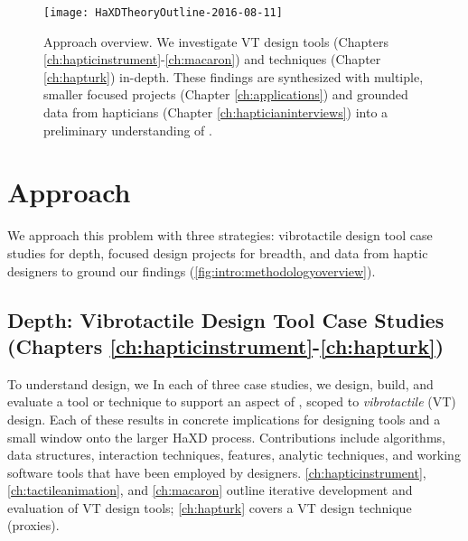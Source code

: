\begin{figure}[htbp]
\begin{center}
\texttt{[image: HaXDTheoryOutline-2016-08-11]}
\caption{Approach overview. We investigate VT design tools (Chapters \ref{ch:hapticinstrument}-\ref{ch:macaron}) and techniques (Chapter \ref{ch:hapturk}) in-depth. These findings are synthesized with multiple, smaller focused projects (Chapter \ref{ch:applications}) and grounded data from hapticians (Chapter \ref{ch:hapticianinterviews}) into a preliminary understanding of \haxd.}
\label{fig:intro:methodologyoverview}
\end{center}
\end{figure}



\section{Approach}
We approach this problem with three strategies: vibrotactile design tool case studies for depth,  %
focused design projects for breadth, and data from haptic designers to ground our findings  (\autoref{fig:intro:methodologyoverview}).

\subsection{Depth: Vibrotactile Design Tool Case Studies (Chapters \ref{ch:hapticinstrument}-\ref{ch:hapturk})}
To understand design, we 
In each of three case studies, we design, build, and evaluate a tool or technique to support an aspect of \haxd, scoped to \emph{vibrotactile} (VT) design.
Each of these results in concrete implications for designing tools and a small window onto the larger HaXD process.
Contributions include algorithms, data structures, interaction techniques, features, analytic techniques, and working software tools that have been employed by designers.
\autoref{ch:hapticinstrument}, \autoref{ch:tactileanimation}, and \autoref{ch:macaron} outline iterative development and evaluation of VT design tools; \autoref{ch:hapturk} covers a VT design technique (proxies).

